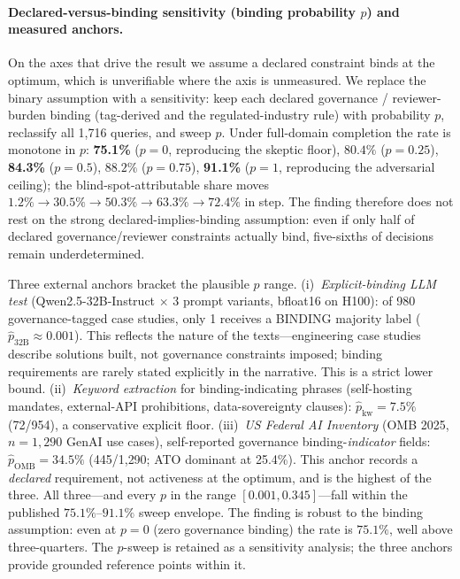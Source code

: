 \documentclass{article} %
\begin{document}
\paragraph{Declared-versus-binding sensitivity (binding probability $p$) and measured anchors.}
On the axes that drive the result we assume a declared constraint binds at the optimum, which is unverifiable where the axis is unmeasured. We replace the binary assumption with a sensitivity: keep each declared governance / reviewer-burden binding (tag-derived and the regulated-industry rule) with probability $p$, reclassify all 1{,}716 queries, and sweep $p$. Under full-domain completion the rate is monotone in $p$: \textbf{75.1\%} ($p{=}0$, reproducing the skeptic floor), $80.4\%$ ($p{=}0.25$), \textbf{84.3\%} ($p{=}0.5$), $88.2\%$ ($p{=}0.75$), \textbf{91.1\%} ($p{=}1$, reproducing the adversarial ceiling); the blind-spot-attributable share moves $1.2\% \to 30.5\% \to 50.3\% \to 63.3\% \to 72.4\%$ in step. The finding therefore does not rest on the strong declared-implies-binding assumption: even if only half of declared governance/reviewer constraints actually bind, five-sixths of decisions remain underdetermined.

Three external anchors bracket the plausible $p$ range.
(i)~\emph{Explicit-binding LLM test} (Qwen2.5-32B-Instruct $\times$ 3 prompt variants, bfloat16 on H100): of 980 governance-tagged case studies, only 1 receives a BINDING majority label ($\hat{p}_{\text{32B}} \approx 0.001$). This reflects the nature of the texts---engineering case studies describe solutions built, not governance constraints imposed; binding requirements are rarely stated explicitly in the narrative. This is a strict lower bound.
(ii)~\emph{Keyword extraction} for binding-indicating phrases (self-hosting mandates, external-API prohibitions, data-sovereignty clauses): $\hat{p}_{\text{kw}} = 7.5\%$ (72/954), a conservative explicit floor.
(iii)~\emph{US Federal AI Inventory} (OMB 2025, $n{=}1{,}290$ GenAI use cases), self-reported governance binding-\emph{indicator} fields: $\hat{p}_{\text{OMB}} = 34.5\%$ (445/1{,}290; ATO dominant at 25.4\%). This anchor records a \emph{declared} requirement, not activeness at the optimum, and is the highest of the three.
All three---and every $p$ in the range $[0.001, 0.345]$---fall within the published $75.1\%$--$91.1\%$ sweep envelope. The finding is robust to the binding assumption: even at $p = 0$ (zero governance binding) the rate is $75.1\%$, well above three-quarters. The $p$-sweep is retained as a sensitivity analysis; the three anchors provide grounded reference points within it.
\end{document}
